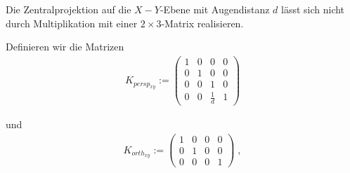 \begin{Bemerkung}
Die Zentralprojektion auf die $X-Y$-Ebene mit Augendistanz $d$ lässt sich nicht durch Multiplikation mit einer  $2 \times 3$-Matrix realisieren.
\end{Bemerkung}



Definieren wir die Matrizen
\begin{align*}
K_{persp_{xy}} := \begin{pmatrix}  
1   &  0 & 0 & 0  \\
0   &  1 & 0 & 0  \\
0   &  0 & 1 & 0  \\
0   &  0 & \frac{1}{d} & 1  
\end{pmatrix} 
\end{align*}

und 
\begin{align*}
K_{orth_{xy}} := \begin{pmatrix}  
1   &  0 & 0 & 0  \\
0   &  1 & 0 & 0  \\
0   &  0 & 0 & 1  
\end{pmatrix} \; ,
\end{align*}


